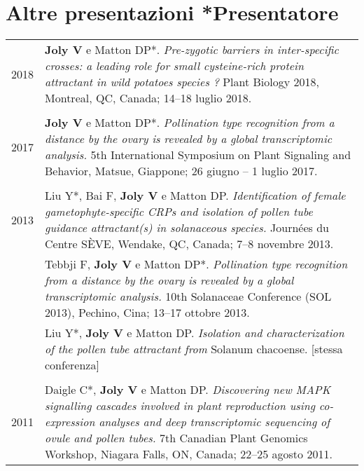 \documentclass[letterpaper,12pt]{article}
\begin{document}
\vspace{6mm}

\section[Altre presentazioni]{Altre presentazioni \hfill \small{*Presentatore}}

\begin{tabularx}{\textwidth}{@{}r|X@{}}

2018
& \textbf{Joly V} e Matton DP*.
  \emph{Pre-zygotic barriers in inter-specific crosses: a leading role for small
  cysteine-rich protein attractant in wild potatoes species ?}
  Plant Biology 2018, Montreal, QC, Canada;
  14–18 luglio 2018.
  \\

\multicolumn{2}{c}{} \\

2017
& \textbf{Joly V} e Matton DP*.
  \emph{Pollination type recognition from a distance by the ovary is revealed
  by a global transcriptomic analysis.}
  5th International Symposium on Plant Signaling and Behavior, Matsue, Giappone;
  26 giugno – 1 luglio 2017.
  \\

\multicolumn{2}{c}{} \\

2013
& Liu Y*, Bai F, \textbf{Joly V} e Matton DP.
  \emph{Identification of female gametophyte-specific CRPs and isolation of
  pollen tube guidance attractant(s) in solanaceous species.}
  Journées du Centre SÈVE, Wendake, QC, Canada;
  7–8 novembre 2013.
  \vspace{1.5mm}
  \\

& Tebbji F, \textbf{Joly V} e Matton DP*. \emph{Pollination type recognition
  from a distance by the ovary is revealed by a global transcriptomic analysis.}
  10th Solanaceae Conference (SOL 2013), Pechino, Cina;
  13–17 ottobre 2013.
  \vspace{1.5mm}
  \\

& Liu Y*, \textbf{Joly V} e Matton DP.
  \emph{Isolation and characterization of the pollen tube attractant from}
  Solanum chacoense. [stessa conferenza]
  \\

\multicolumn{2}{c}{} \\

2011
& Daigle C*, \textbf{Joly V} e Matton DP.
  \emph{Discovering new MAPK signalling cascades involved in plant reproduction
  using co-expression analyses and deep transcriptomic sequencing of ovule
  and pollen tubes.}
  7th Canadian Plant Genomics Workshop, Niagara Falls, ON, Canada;
  22–25 agosto 2011.
  \\

\end{tabularx}
\end{document}
